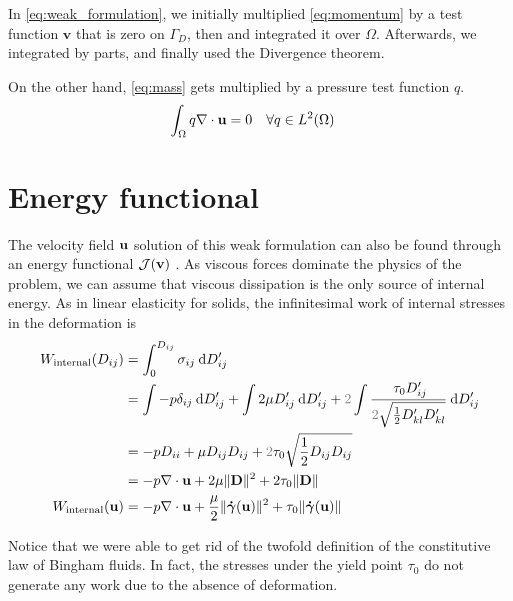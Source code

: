 \documentclass[11 pt]{report}
\begin{document}
In \cref{eq:weak_formulation}, we initially multiplied \autoref{eq:momentum} by a test function $\mathbf{v}$ that is zero on $\Gamma_D$, then and integrated it over $\Omega$. Afterwards, we integrated by parts, and finally used the Divergence theorem.

On the other hand, \autoref{eq:mass} gets multiplied by a pressure test function $q$.
\begin{equation}
    \begin{aligned}
        \int_{\Omega} q \nabla \cdot \mathbf{u} &= 0  && \forall q \in L^2(\Omega)
    \end{aligned}
    \label{eq:weak_formulation_p}
\end{equation}


\section{Energy functional}

The velocity field $\mathbf{u}$ solution of this weak formulation can also be found through an energy functional $\mathcal{J}(\mathbf{v})$ \cite{Saramito, Bleyer}. As viscous forces dominate the physics of the problem, we can assume that viscous dissipation is the only source of internal energy. As in linear elasticity for solids, the infinitesimal work of internal stresses in the deformation is
\begin{equation}
    \begin{aligned}
        W_{\textrm{internal}}(D_{ij}) &= \int_{0}^{D_{ij}} \sigma_{ij} \:\dd D_{ij}'\\
        &= \int -p\delta_{ij} \:\dd D_{ij}' + \int 2\mu D_{ij}' \:\dd D_{ij}' + {\color{gray} 2} \int \frac{ \: \tau_0 D_{ij}'}{{\color{gray} 2} \sqrt{\frac{1}{2} D_{kl}'D_{kl}'}} \:\dd D_{ij}'\\
        &= -p D_{ii} + \mu D_{ij} D_{ij} + {\color{gray} 2} \tau_0 \sqrt{\frac{1}{2} D_{ij} D_{ij}}\\
        &= -p \nabla \cdot \uu + 2\mu \|\mathbf{D}\|^2 + 2\tau_0 \|\mathbf{D}\|\\
        W_{\textrm{internal}}(\uu) &= -p \nabla \cdot \uu + \frac{\mu}{2} \|\gam(\uu)\|^2 + \tau_0 \|\gam(\uu)\|
    \end{aligned}
    \label{eq:energy_density}
\end{equation}

Notice that we were able to get rid of the twofold definition of the constitutive law of Bingham fluids. In fact, the stresses under the yield point $\tau_0$ do not generate any work due to the absence of deformation.
\end{document}
